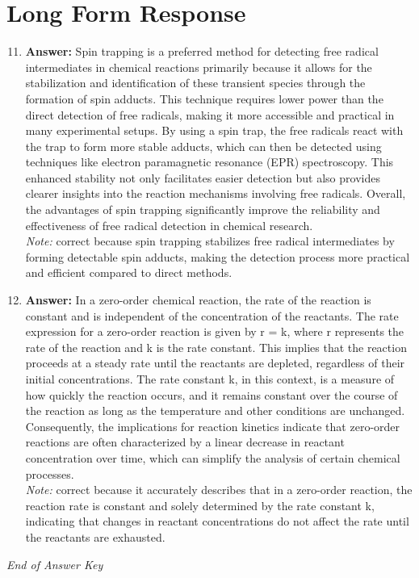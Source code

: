 \documentclass[12pt]{article}
\begin{document}
\section*{Long Form Response}
\begin{enumerate}[label=\arabic*.]
\setcounter{enumi}{10}
\item \textbf{Answer:} Spin trapping is a preferred method for detecting free radical intermediates in chemical reactions primarily because it allows for the stabilization and identification of these transient species through the formation of spin adducts. This technique requires lower power than the direct detection of free radicals, making it more accessible and practical in many experimental setups. By using a spin trap, the free radicals react with the trap to form more stable adducts, which can then be detected using techniques like electron paramagnetic resonance (EPR) spectroscopy. This enhanced stability not only facilitates easier detection but also provides clearer insights into the reaction mechanisms involving free radicals. Overall, the advantages of spin trapping significantly improve the reliability and effectiveness of free radical detection in chemical research.
\\ \textit{Note:} correct because spin trapping stabilizes free radical intermediates by forming detectable spin adducts, making the detection process more practical and efficient compared to direct methods.
\item \textbf{Answer:} In a zero-order chemical reaction, the rate of the reaction is constant and is independent of the concentration of the reactants. The rate expression for a zero-order reaction is given by r = k, where r represents the rate of the reaction and k is the rate constant. This implies that the reaction proceeds at a steady rate until the reactants are depleted, regardless of their initial concentrations. The rate constant k, in this context, is a measure of how quickly the reaction occurs, and it remains constant over the course of the reaction as long as the temperature and other conditions are unchanged. Consequently, the implications for reaction kinetics indicate that zero-order reactions are often characterized by a linear decrease in reactant concentration over time, which can simplify the analysis of certain chemical processes.
\\ \textit{Note:} correct because it accurately describes that in a zero-order reaction, the reaction rate is constant and solely determined by the rate constant k, indicating that changes in reactant concentrations do not affect the rate until the reactants are exhausted.
\end{enumerate}

\vfill
\noindent\textit{End of Answer Key}
\end{document}
